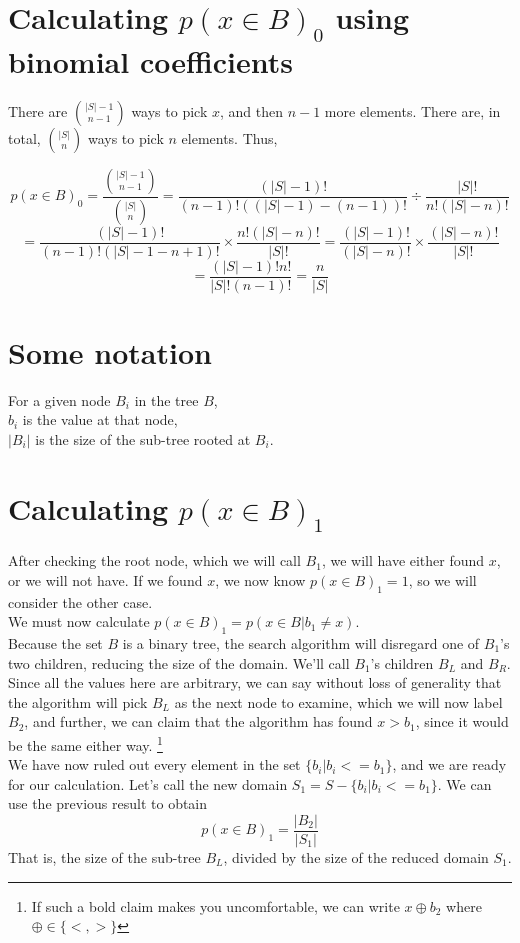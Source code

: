 \documentclass[10pt,a4paper]{article}
\begin{document}
\section*{Calculating $p(x \in B)_0$ using binomial coefficients}

There are $|S|-1 \choose n-1$ ways to pick $x$, and then $n-1$ more elements. There are, in total, $|S| \choose n$ ways to pick $n$ elements. Thus,

$$p(x \in B)_0
	= 
	\frac{
			{|S| - 1 \choose n-1}
		}{
			{|S| \choose n}
		}
= 	
		\frac{(|S|-1)!}{(n-1)!((|S|-1) - (n-1))!}
	\div
		\frac{|S|!}{n!(|S|-n)!}
$$
$$=	
		\frac{(|S|-1)!}{(n-1)!(|S|-1 - n + 1)!}
	\times
		\frac{n!(|S|-n)!}{|S|!}
=
		\frac{(|S|-1)!}{(|S| - n)!}
	\times
		\frac{(|S|-n)!}{|S|!}
$$
$$=
	\frac{
		(|S|-1)!n!
	}{
		|S|! (n-1)!
	} = \frac{n}{|S|}
$$
\section*{Some notation}
For a given node $B_i$ in the tree $B$,\\
$b_i$ is the value at that node,\\
$|B_i|$ is the size of the sub-tree rooted at $B_i$.
\section*{Calculating $p(x \in B)_1$}
After checking the root node, which we will call $B_1$, we will have either found $x$, or we will not have. If we found $x$, we now know $p(x \in B)_1 = 1$, so we will consider the other case.\\
We must now calculate $p(x \in B)_1 = p(x \in B | b_1 \neq x)$.\\
Because the set $B$ is a binary tree, the search algorithm will disregard one of $B_1$'s two children, reducing the size of the domain. We'll call $B_1$'s children $B_L$ and $B_R$. Since all the values here are arbitrary, we can say without loss of generality that the algorithm will pick $B_L$ as the next node to examine, which we will now label $B_2$, and further, we can claim that the algorithm has found $x > b_1$, since it would be the same either way.
\footnote{If such a bold claim makes you uncomfortable, we can write $x \oplus b_2$ where $\oplus \in \{<, >\}$}\\
We have now ruled out every element in the set $\{b_i | b_i <= b_1\}$, and we are ready for our calculation. Let's call the new domain $S_1 = S - \{b_i | b_i <= b_1 \}$. We can use the previous result to obtain
$$p(x \in B)_1 = \frac{|B_2|}{|S_1|}$$
That is, the size of the sub-tree $B_L$, divided by the size of the reduced domain $S_1$.
\end{document}
